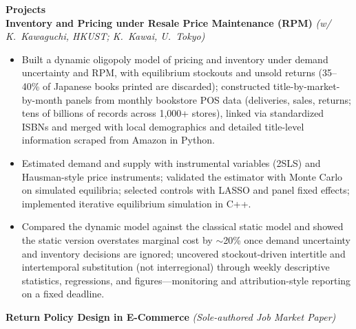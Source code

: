 \documentclass[11pt,letterpaper]{article}
\begin{document}
{\large \textbf{Projects}}\\[-0.5pt]
\textbf{Inventory and Pricing under Resale Price Maintenance (RPM)} \textit{(w/ K.\ Kawaguchi, HKUST; K.\ Kawai, U.\ Tokyo)}\\
\vspace{-6pt}
\begin{itemize}
  \item Built a dynamic oligopoly model of pricing and inventory under demand uncertainty and RPM, with equilibrium stockouts and unsold returns (35--40\% of Japanese books printed are discarded); constructed title-by-market-by-month panels from monthly bookstore POS data (deliveries, sales, returns; tens of billions of records across 1{,}000+ stores), linked via standardized ISBNs and merged with local demographics and detailed title-level information scraped from Amazon in Python.
  \item Estimated demand and supply with instrumental variables (2SLS) and Hausman-style price instruments; validated the estimator with Monte Carlo on simulated equilibria; selected controls with LASSO and panel fixed effects; implemented iterative equilibrium simulation in C++.
  \item Compared the dynamic model against the classical static model and showed the static version overstates marginal cost by \(\sim\)20\% once demand uncertainty and inventory decisions are ignored; uncovered stockout-driven intertitle and intertemporal substitution (not interregional) through weekly descriptive statistics, regressions, and figures---monitoring and attribution-style reporting on a fixed deadline.
\end{itemize}
\vspace{-3pt}
\textbf{Return Policy Design in E-Commerce} \textit{(Sole-authored Job Market Paper)}\\
\vspace{-6pt}
\end{document}
